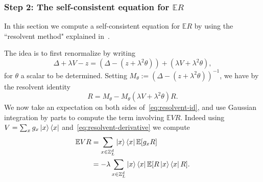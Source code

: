 \documentclass[11pt]{amsart}
\def\Z{{\mathbb{Z}}}
\def\Expec{{\mathbb E}}
\def\bra#1{\mathinner{\langle{#1}|}}
\def\ket#1{\mathinner{|{#1}\rangle}}
\numberwithin{equation}{section}
\numberwithin{theorem}{section}
\begin{document}
\subsubsection{Step 2: The self-consistent equation for $\Expec R$}
\label{sec:sce-intro}
In this section we compute a self-consistent equation for $\Expec R$ by using the ``resolvent method" explained in~\cite{erdos2019matrix}.

The idea is to first renormalize by writing
\[
\Delta + \lambda V - z = (\Delta - (z+\lambda^2\theta)) + (\lambda V + \lambda^2\theta),
\]
for $\theta$ a scalar to be determined.
Setting $M_\theta := (\Delta - (z+\lambda^2\theta))^{-1}$, we have by the resolvent identity
\begin{equation}
\label{eq:resolvent-id}
R = M_\theta - M_\theta (\lambda V + \lambda^2 \theta) R.
\end{equation}
We now take an expectation on both sides of~\eqref{eq:resolvent-id}, and use
Gaussian integration by parts to compute the term involving $\Expec VR$.
Indeed using $V = \sum_x g_x \ket{x}\bra{x}$ and~\eqref{eq:resolvent-derivative} we compute
\begin{align*}
\Expec VR &=\sum_{x\in \Z^{d}_L}\ket{x}\bra{x}\Expec[g_xR]\\
& = -\lambda \sum_{x\in \Z^{d}_L}\ket{x}\bra{x}\mathbb{E}[R\ket{x}\bra{x}R].
\end{align*}
\end{document}
